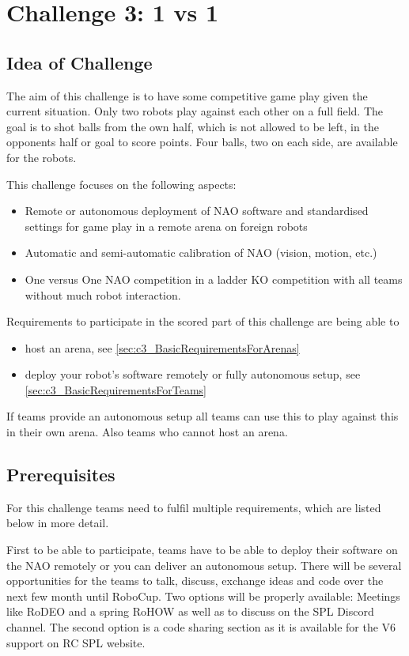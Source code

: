 \section{Challenge 3: 1 vs 1}
\label{sec:OneVsOneChallenge}

\subsection{Idea of Challenge}
The aim of this challenge is to have some competitive game play given the current situation. Only two robots play against each other on a full field. The goal is to shot balls from the own half, which is not allowed to be left, in the opponents half or goal to score points. Four balls, two on each side, are available for the robots.

This challenge focuses on the following aspects:
\begin{itemize}
    \item Remote or autonomous deployment of NAO software and standardised settings for game play in a remote arena on foreign robots
    \item Automatic and semi-automatic calibration of NAO (vision, motion, etc.) 
    \item One versus One NAO competition in a ladder KO competition with all teams without much robot interaction. 
\end{itemize}

Requirements to participate in the scored part of this challenge are being able to
\begin{itemize}
	\item host an arena, see \ref{sec:c3_BasicRequirementsForArenas}
	\item deploy your robot's software remotely or fully autonomous setup, see \ref{sec:c3_BasicRequirementsForTeams}
\end{itemize}

If teams provide an autonomous setup all teams can use this to play against this in their own arena. Also teams who cannot host an arena.

\subsection{Prerequisites}
For this challenge teams need to fulfil multiple requirements, which are listed below in more detail.

First to be able to participate, teams have to be able to deploy their software on the NAO remotely or you can deliver an autonomous setup. There will be several opportunities for the teams to talk, discuss, exchange ideas and code over the next few month until RoboCup. Two options will be properly available: Meetings like RoDEO and a spring RoHOW as well as to discuss on the SPL Discord channel. The second option is a code sharing section as it is available for the V6 support on RC SPL website.

